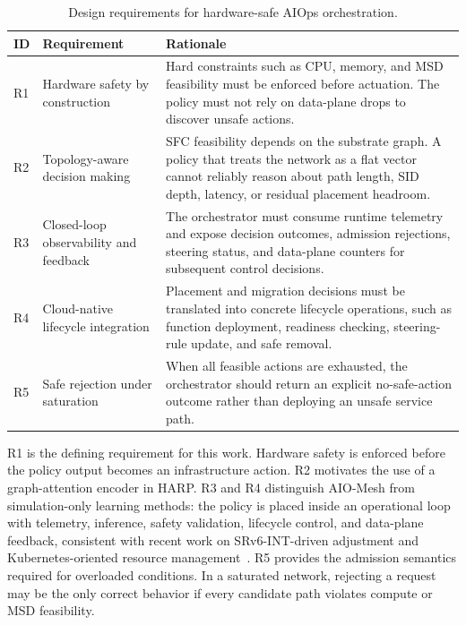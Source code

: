 \documentclass[final,5p]{elsarticle}
\begin{document}
\begin{table}[t]
\centering
\caption{Design requirements for hardware-safe AIOps orchestration.}
\label{tab:design_requirements}
\renewcommand{\arraystretch}{1.15}
\small
\begin{tabular}{p{0.7cm}p{2.3cm}p{5.0cm}}
\toprule
\textbf{ID} & \textbf{Requirement} & \textbf{Rationale} \\
\midrule
R1 & Hardware safety by construction &
Hard constraints such as CPU, memory, and MSD feasibility must be enforced before actuation. The policy must not rely on data-plane drops to discover unsafe actions. \\

R2 & Topology-aware decision making &
SFC feasibility depends on the substrate graph. A policy that treats the network as a flat vector cannot reliably reason about path length, SID depth, latency, or residual placement headroom. \\

R3 & Closed-loop observability and feedback &
The orchestrator must consume runtime telemetry and expose decision outcomes, admission rejections, steering status, and data-plane counters for subsequent control decisions. \\

R4 & Cloud-native lifecycle integration &
Placement and migration decisions must be translated into concrete lifecycle operations, such as function deployment, readiness checking, steering-rule update, and safe removal. \\

R5 & Safe rejection under saturation &
When all feasible actions are exhausted, the orchestrator should return an explicit no-safe-action outcome rather than deploying an unsafe service path. \\
\bottomrule
\end{tabular}
\end{table}

R1 is the defining requirement for this work. Hardware safety is enforced before the policy output becomes an infrastructure action. R2 motivates the use of a graph-attention encoder in HARP. R3 and R4 distinguish AIO-Mesh from simulation-only learning methods: the policy is placed inside an operational loop with telemetry, inference, safety validation, lifecycle control, and data-plane feedback, consistent with recent work on SRv6-INT-driven adjustment and Kubernetes-oriented resource management~\cite{yan2024srv6int,ding2023kubernetes,mao2023flowcon}. R5 provides the admission semantics required for overloaded conditions. In a saturated network, rejecting a request may be the only correct behavior if every candidate path violates compute or MSD feasibility.
\end{document}
